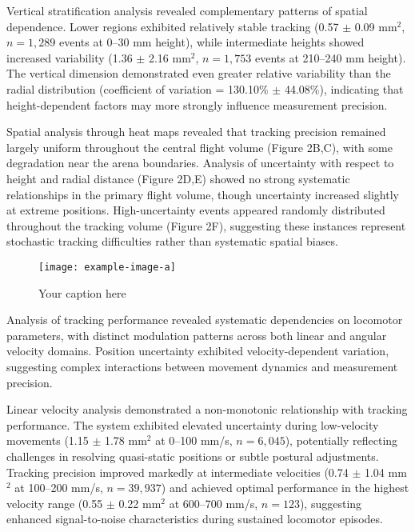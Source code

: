 \documentclass[../main/thesis_msc.tex]{subfiles}
\begin{document}
Vertical stratification analysis revealed complementary patterns of spatial dependence. Lower regions exhibited relatively stable tracking (0.57 $\pm$ 0.09 mm$^2$, $n = 1,289$ events at 0--30 mm height), while intermediate heights showed increased variability (1.36 $\pm$ 2.16 mm$^2$, $n = 1,753$ events at 210--240 mm height). The vertical dimension demonstrated even greater relative variability than the radial distribution (coefficient of variation = 130.10\% $\pm$ 44.08\%), indicating that height-dependent factors may more strongly influence measurement precision.

Spatial analysis through heat maps revealed that tracking precision remained largely uniform throughout the central flight volume (Figure 2B,C), with some degradation near the arena boundaries. Analysis of uncertainty with respect to height and radial distance (Figure 2D,E) showed no strong systematic relationships in the primary flight volume, though uncertainty increased slightly at extreme positions. High-uncertainty events appeared randomly distributed throughout the tracking volume (Figure 2F), suggesting these instances represent stochastic tracking difficulties rather than systematic spatial biases.

\begin{figure}[htbp]
    \centering
    \texttt{[image: example-image-a]}
    \caption{Your caption here}
    \label{fig:your-label}
\end{figure}

Analysis of tracking performance revealed systematic dependencies on locomotor parameters, with distinct modulation patterns across both linear and angular velocity domains. Position uncertainty exhibited velocity-dependent variation, suggesting complex interactions between movement dynamics and measurement precision.

Linear velocity analysis demonstrated a non-monotonic relationship with tracking performance. The system exhibited elevated uncertainty during low-velocity movements (1.15 $\pm$ 1.78 mm$^2$ at 0--100 mm/s, $n = 6,045$), potentially reflecting challenges in resolving quasi-static positions or subtle postural adjustments. Tracking precision improved markedly at intermediate velocities (0.74 $\pm$ 1.04 mm$^2$ at 100--200 mm/s, $n = 39,937$) and achieved optimal performance in the highest velocity range (0.55 $\pm$ 0.22 mm$^2$ at 600--700 mm/s, $n = 123$), suggesting enhanced signal-to-noise characteristics during sustained locomotor episodes.
\end{document}
